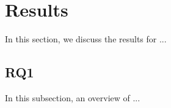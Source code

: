 \section{Results}
\label{sec:results}
\vspace{0.2 cm}

In this section, we discuss the results for ... 

\vspace{0.1 cm}
\subsection{RQ1}
\label{sec:results_rq1}
\vspace{0.1 cm}

In this subsection, an overview of ...

\begin{table}[H]
\centering


\end{table}
